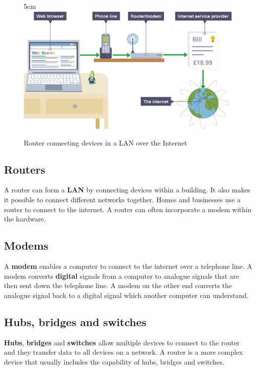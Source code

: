\documentclass[a4paper,12pt]{article}
\begin{document}
\begin{figure}[18]{5cm}
\centering
\includegraphics[width=16cm]{./large.PNG}
\caption{Router connecting devices in a LAN over the Internet}\label{wrap-fig:4}
\end{figure}

\subsection{Routers}
A router can form a \textbf{LAN} by connecting devices within a building. It also makes it possible to connect different networks together. Homes and businesses use a router to connect to the internet. A router can often incorporate a modem within the hardware.

\subsection{Modems}
A \textbf{modem} enables a computer to connect to the internet over a telephone line. A modem converts \textbf{digital} signals from a computer to analogue signals that are then sent down the telephone line. A modem on the other end converts the analogue signal back to a digital signal which another computer can understand.

\subsection{Hubs, bridges and switches}
\textbf{Hubs}, \textbf{bridges} and \textbf{switches} allow multiple devices to connect to the router and they transfer data to all devices on a network. A router is a more complex device that usually includes the capability of hubs, bridges and switches.
\end{document}
